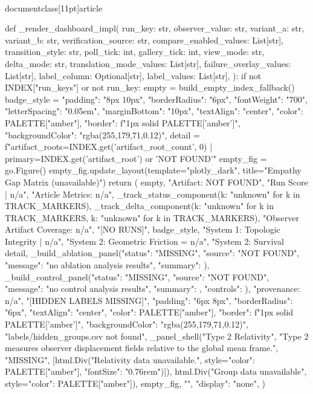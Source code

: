 \\documentclass[11pt]{article}
\begin{document}
\begin{CodeBlock}
{{{{{{{{def _render_dashboard_impl(
    run_key: str,
    observer_value: str,
    variant_a: str,
    variant_b: str,
    verification_source: str,
    compare_enabled_values: List[str],
    transition_style: str,
    poll_tick: int,
    gallery_tick: int,
    view_mode: str,
    delta_mode: str,
    translation_mode_values: List[str],
    failure_overlay_values: List[str],
    label_column: Optional[str],
    label_values: List[str],
):
    if not INDEX["run_keys"] or not run_key:
        empty = build_empty_index_fallback()
        badge_style = {
            "padding": "8px 10px",
            "borderRadius": "6px",
            "fontWeight": "700",
            "letterSpacing": "0.05em",
            "marginBottom": "10px",
            "textAlign": "center",
            "color": PALETTE["amber"],
            "border": f"1px solid {PALETTE['amber']}",
            "backgroundColor": "rgba(255,179,71,0.12)",
        }
        detail = f"artifact_roots={INDEX.get('artifact_root_count', 0)} | primary={INDEX.get('artifact_root') or 'NOT FOUND'}"
        empty_fig = go.Figure()
        empty_fig.update_layout(template="plotly_dark", title="Empathy Gap Matrix (unavailable)")
        return (
            empty,
            "Artifact: NOT FOUND",
            "Run Score | n/a",
            "Article Metrics: n/a",
            _track_status_component({k: "unknown" for k in TRACK_MARKERS}),
            _track_delta_component({k: "unknown" for k in TRACK_MARKERS}, {k: "unknown" for k in TRACK_MARKERS}),
            "Observer Artifact Coverage: n/a",
            "[NO RUNS]",
            badge_style,
            "System 1: Topologic Integrity | n/a",
            "System 2: Geometric Friction = n/a",
            "System 2: Survival %
            detail,
            _build_ablation_panel({"status": "MISSING", "source": "NOT FOUND", "message": "no ablation analysis results", "summary": {}}),
            _build_control_panel({"status": "MISSING", "source": "NOT FOUND", "message": "no control analysis results", "summary": {}, "controls": {}}),
            "provenance: n/a",
            "[HIDDEN LABELS MISSING]",
            {"padding": "6px 8px", "borderRadius": "6px", "textAlign": "center", "color": PALETTE["amber"], "border": f"1px solid {PALETTE['amber']}", "backgroundColor": "rgba(255,179,71,0.12)"},
            "labels/hidden_groups.csv not found",
            _panel_shell("Type 2 Relativity", "Type 2 measures observer displacement fields relative to the global mean frame.", "MISSING", [html.Div("Relativity data unavailable.", style={"color": PALETTE["amber"], "fontSize": "0.76rem"})]),
            html.Div("Group data unavailable", style={"color": PALETTE["amber"]}),
            empty_fig,
            "",
            {"display": "none"},
        )

}}}}}}}}
\end{CodeBlock}
\end{document}
